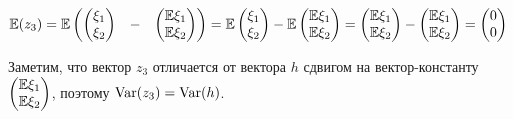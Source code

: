 \begin{problem}
\begin{sol}
$\mathbb{E} (z_3) = \mathbb{E}   \begin{pmatrix}
 \begin{pmatrix}
\xi_1 \\
\xi_2 \\
\end{pmatrix}  & - &  \begin{pmatrix}
\mathbb{E}  \xi_1 \\
\mathbb{E}  \xi_2 \\
\end{pmatrix}  \\
\end{pmatrix}  = \mathbb{E}   \begin{pmatrix}
\xi_1 \\
\xi_2 \\
\end{pmatrix}  - \mathbb{E}   \begin{pmatrix}
\mathbb{E}  \xi_1 \\
\mathbb{E}  \xi_2 \\
\end{pmatrix}  =  \begin{pmatrix}
\mathbb{E}  \xi_1 \\
\mathbb{E}  \xi_2 \\
\end{pmatrix}  -  \begin{pmatrix}
\mathbb{E}  \xi_1 \\
\mathbb{E}  \xi_2 \\
\end{pmatrix}  =  \begin{pmatrix}
0\\
0\\
\end{pmatrix} $

Заметим, что вектор $z_3$ отличается от вектора $h$ сдвигом на вектор-константу $ \begin{pmatrix}
\mathbb{E}  \xi_1 \\
\mathbb{E}  \xi_2 \\
\end{pmatrix} $, поэтому $\operatorname{Var} (z_3) = \operatorname{Var} (h)$.
\end{sol}
\end{problem}







